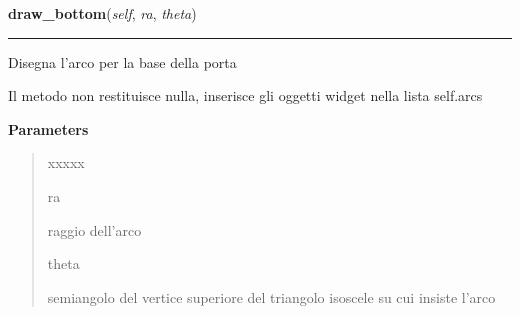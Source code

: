 \hspace{.8\funcindent}\begin{boxedminipage}{\funcwidth}

    \raggedright \textbf{draw\_bottom}(\textit{self}, \textit{ra}, \textit{theta})

    \vspace{-1.5ex}

    \rule{\textwidth}{0.5\fboxrule}
\setlength{\parskip}{2ex}
    Disegna l'arco per la base della porta

    Il metodo non restituisce nulla, inserisce gli oggetti widget nella 
    lista self.arcs

\setlength{\parskip}{1ex}
      \textbf{Parameters}
      \vspace{-1ex}

      \begin{quote}
        \begin{Ventry}{xxxxx}

          \item[ra]

          raggio dell'arco

          \item[theta]

          semiangolo del vertice superiore del triangolo isoscele su cui 
          insiste l'arco

        \end{Ventry}

      \end{quote}

    \end{boxedminipage}

    \label{component:Or:draw_top}

    \vspace{0.5ex}

